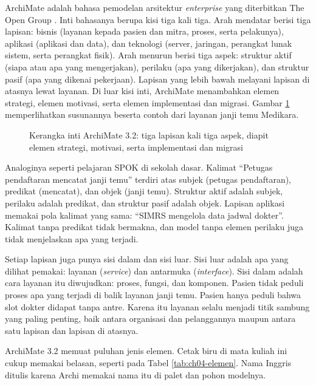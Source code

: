 ArchiMate adalah bahasa pemodelan arsitektur \textit{enterprise} yang
diterbitkan The Open Group \cite{archimate32}. Inti bahasanya berupa kisi tiga
kali tiga. Arah mendatar berisi tiga lapisan: bisnis (layanan kepada pasien
dan mitra, proses, serta pelakunya), aplikasi (aplikasi dan data), dan
teknologi (server, jaringan, perangkat lunak sistem, serta perangkat
fisik). Arah menurun berisi tiga aspek: struktur aktif (siapa atau apa yang
mengerjakan), perilaku (apa yang dikerjakan), dan struktur pasif (apa yang
dikenai pekerjaan). Lapisan yang lebih bawah melayani lapisan di atasnya
lewat layanan. Di luar kisi inti, ArchiMate menambahkan elemen strategi,
elemen motivasi, serta elemen implementasi dan migrasi. Gambar
\ref{fig:ch04-kerangka-inti} memperlihatkan susunannya beserta contoh dari
layanan janji temu Medikara.

\begin{figure}[!htb]
  \centering
  
  \caption{Kerangka inti ArchiMate 3.2: tiga lapisan kali tiga aspek, diapit
           elemen strategi, motivasi, serta implementasi dan migrasi}
  \label{fig:ch04-kerangka-inti}
\end{figure}

Analoginya seperti pelajaran SPOK di sekolah dasar. Kalimat ``Petugas
pendaftaran mencatat janji temu'' terdiri atas subjek (petugas pendaftaran),
predikat (mencatat), dan objek (janji temu). Struktur aktif adalah subjek,
perilaku adalah predikat, dan struktur pasif adalah objek. Lapisan aplikasi
memakai pola kalimat yang sama: ``SIMRS mengelola data jadwal dokter''.
Kalimat tanpa predikat tidak bermakna, dan model tanpa elemen perilaku juga
tidak menjelaskan apa yang terjadi.

Setiap lapisan juga punya sisi dalam dan sisi luar. Sisi luar adalah apa yang
dilihat pemakai: layanan (\textit{service}) dan antarmuka
(\textit{interface}). Sisi dalam adalah cara layanan itu diwujudkan: proses,
fungsi, dan komponen. Pasien tidak peduli proses apa yang terjadi di balik
layanan janji temu. Pasien hanya peduli bahwa slot dokter didapat tanpa antre.
Karena itu layanan selalu menjadi titik sambung yang paling penting, baik
antara organisasi dan pelanggannya maupun antara satu lapisan dan lapisan di
atasnya.

ArchiMate 3.2 memuat puluhan jenis elemen. Cetak biru di mata kuliah ini
cukup memakai belasan, seperti pada Tabel \ref{tab:ch04-elemen}. Nama Inggris
ditulis karena Archi memakai nama itu di palet dan pohon modelnya.

